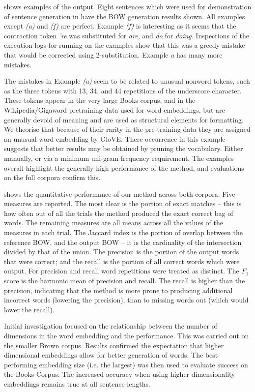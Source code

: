 \documentclass{book}
\begin{document}
  shows examples of the output. Eight sentences which were used for demonstration of sentence generation in \textcite{iyyer2014generating,Bowman2015SmoothGeneration} have the BOW generation results shown. All examples except \emph{(a)} and \emph{(f)} are perfect. Example \emph{(f)} is interesting as it seems that the contraction token \emph{'re} was substituted for \emph{are}, and \emph{do} for \emph{doing}. Inspections of the execution logs for running on the examples show that this was a greedy mistake that would be corrected using 2-substitution.  Example \emph{a} has many more mistakes.

The mistakes in Example \emph{(a)} seem to be related to unusual nonword tokens, such as the three tokens with 13, 34, and 44 repetitions of the underscore character. These tokens appear in the very large Books corpus, and in the Wikipedia/Gigaword pretraining data used for word embeddings, but are generally devoid of meaning and are used as structural elements for formatting. We theorise that because of their rarity in the pre-training data they are assigned an unusual word-embedding by GloVE. There occurrence in this example suggests that better results may be obtained by pruning the vocabulary. Either manually, or via a minimum uni-gram frequency requirement. The examples overall highlight the generally high performance of the method, and evaluations on the full corpora confirm this.

 shows the quantitative performance of our method across both corpora. Five measures are reported. The most clear is the portion of exact matches -- this is how often out of all the trials the method produced the exact correct bag of words. The remaining measures are all means across all the values of the measures in each trial.  The Jaccard index is the portion of overlap between the reference BOW, and the output BOW -- it is the cardinality of the intersection divided by that of the union. The precision is the portion of the output words that were correct; and the recall is the portion of all correct words which were output. For precision and recall word repetitions were treated as distinct. The $F_1$ score is the harmonic mean of precision and recall. The recall is higher than the precision, indicating that the method is more prone to producing additional incorrect words (lowering the precision), than to missing words out (which would lower the recall). 

Initial investigation focused on the relationship between the number of dimensions in the word embedding and the performance. This was carried out on the smaller Brown corpus. Results confirmed the expectation that higher dimensional embeddings allow for better generation of words. The best performing embedding size (i.e. the largest)  was then used to evaluate success on the Books Corpus. The increased accuracy when using higher dimensionality embeddings remains true at all sentence lengths.
\end{document}
